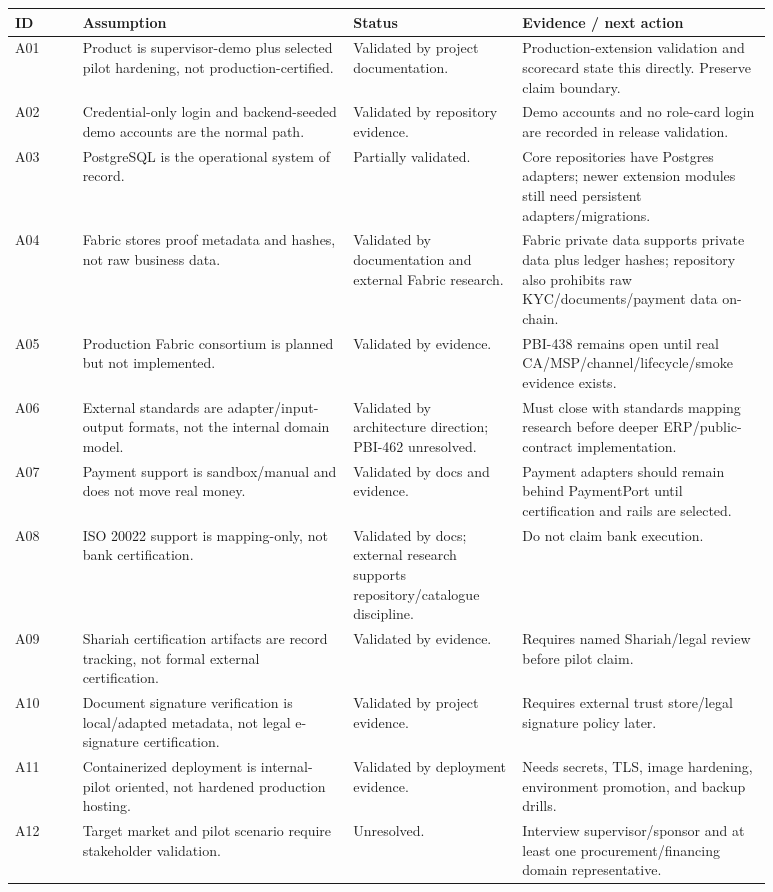 \documentclass[11pt,a4paper]{article}
\begin{document}
\begin{longtable}{P{0.08\linewidth}P{0.32\linewidth}P{0.20\linewidth}P{0.28\linewidth}}
\toprule
ID & Assumption & Status & Evidence / next action \\
\midrule
A01 & Product is supervisor-demo plus selected pilot hardening, not production-certified. & Validated by project documentation. & Production-extension validation and scorecard state this directly. Preserve claim boundary. \\
A02 & Credential-only login and backend-seeded demo accounts are the normal path. & Validated by repository evidence. & Demo accounts and no role-card login are recorded in release validation. \\
A03 & PostgreSQL is the operational system of record. & Partially validated. & Core repositories have Postgres adapters; newer extension modules still need persistent adapters/migrations. \\
A04 & Fabric stores proof metadata and hashes, not raw business data. & Validated by documentation and external Fabric research. & Fabric private data supports private data plus ledger hashes; repository also prohibits raw KYC/documents/payment data on-chain. \\
A05 & Production Fabric consortium is planned but not implemented. & Validated by evidence. & PBI-438 remains open until real CA/MSP/channel/lifecycle/smoke evidence exists. \\
A06 & External standards are adapter/input-output formats, not the internal domain model. & Validated by architecture direction; PBI-462 unresolved. & Must close with standards mapping research before deeper ERP/public-contract implementation. \\
A07 & Payment support is sandbox/manual and does not move real money. & Validated by docs and evidence. & Payment adapters should remain behind PaymentPort until certification and rails are selected. \\
A08 & ISO 20022 support is mapping-only, not bank certification. & Validated by docs; external research supports repository/catalogue discipline. & Do not claim bank execution. \\
A09 & Shariah certification artifacts are record tracking, not formal external certification. & Validated by evidence. & Requires named Shariah/legal review before pilot claim. \\
A10 & Document signature verification is local/adapted metadata, not legal e-signature certification. & Validated by project evidence. & Requires external trust store/legal signature policy later. \\
A11 & Containerized deployment is internal-pilot oriented, not hardened production hosting. & Validated by deployment evidence. & Needs secrets, TLS, image hardening, environment promotion, and backup drills. \\
A12 & Target market and pilot scenario require stakeholder validation. & Unresolved. & Interview supervisor/sponsor and at least one procurement/financing domain representative. \\
\bottomrule
\end{longtable}
\end{document}
